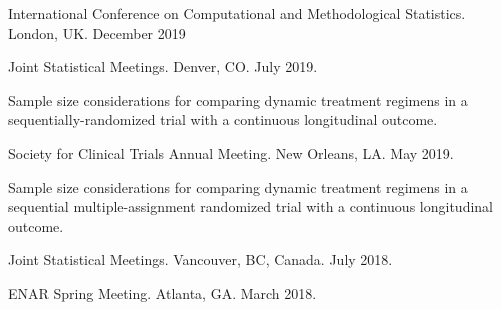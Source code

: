 \documentclass[letterpaper,11pt]{article} %
\begin{document}
\begin{etaremune}
\begin{conflist}
			\item International Conference on Computational and Methodological Statistics. London, UK. December 2019
			\item Joint Statistical Meetings. Denver, CO. July 2019.
		\end{conflist}
		\item Sample size considerations for comparing dynamic treatment regimens in a sequentially-randomized trial with a continuous longitudinal outcome.
		\begin{conflist}
			\item Society for Clinical Trials Annual Meeting. New Orleans, LA.  May 2019.
		\end{conflist}
		\item Sample size considerations for comparing dynamic treatment regimens in a sequential multiple-assignment randomized trial with a continuous longitudinal outcome.
		\begin{conflist}
			\item Joint Statistical Meetings. Vancouver, BC, Canada. July 2018.
			\item ENAR Spring Meeting. Atlanta, GA.  March 2018.
		\end{conflist}		
	\end{etaremune}
\end{document}
